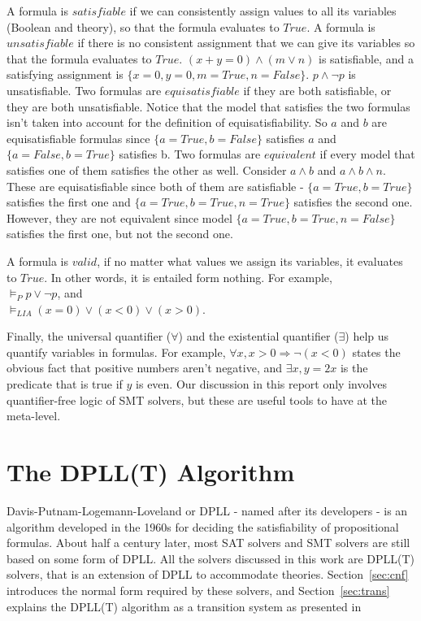 \documentclass{article}
\begin{document}
A formula is $satisfiable$ if we can consistently assign
values to all its variables (Boolean and theory), 
so that the formula evaluates to $True$. A formula is 
$unsatisfiable$ if there is no consistent assignment that 
we can give its variables so that the formula evaluates to 
$True$. $(x + y = 0) \land (m \lor n)$ is satisfiable, 
and a satisfying assignment is $\{x = 0, y = 0, m = True, 
n = False\}$. $p \land \neg p$ is unsatisfiable. Two formulas 
are $equisatisfiable$ if they are both satisfiable, or they 
are both unsatisfiable. Notice that the model that 
satisfies the two formulas isn't taken into account 
for the definition of equisatisfiability. So $a$ and $b$ are 
equisatisfiable formulas since $\{a = True, b = False\}$ 
satisfies $a$ and $\{a = False, b = True\}$ satisfies b. 
Two formulas are $equivalent$ if every model that satisfies 
one of them satisfies the other as well. Consider 
$a \land b$ and $a \land b \land n$. These are 
equisatisfiable since both of them are satisfiable - 
$\{a = True, b = True\}$ satisfies the first one and 
$\{a = True, b = True, n = True\}$ satisfies the second one.
However, they are not equivalent since model 
$\{a = True, b = True, n = False\}$ satisfies the first one, 
but not the second one.

A formula is $valid$, if no matter what values we assign its 
variables, it evaluates to $True$. In other words, it is
entailed form nothing. For example, \\
$\models_P p \lor \neg p$, and \\
$\models_{LIA} (x = 0) \lor (x < 0) \lor (x > 0)$.

Finally, the universal quantifier ($\forall$) and 
the existential quantifier ($\exists$) help us quantify 
variables in formulas. For example, $\forall x, x > 0 
\Rightarrow \neg (x < 0)$ states the obvious fact that 
positive numbers aren't negative, and $\exists x, y = 2x$ 
is the predicate that is true if $y$ is even. Our discussion 
in this report only involves quantifier-free logic of SMT 
solvers, but these are useful tools to have at the meta-level.


\section{The DPLL(T) Algorithm}
\label{sec:dpll}
Davis-Putnam-Logemann-Loveland or DPLL - named after its 
developers - is an algorithm developed in the 1960s 
for deciding the satisfiability of propositional formulas.
About half a century later, most SAT solvers and SMT solvers
are still based on some form of DPLL. All the solvers 
discussed in this work are DPLL(T) solvers, that is an 
extension of DPLL to accommodate theories. 
Section~\ref{sec:cnf}
introduces the normal form required by these solvers, 
and Section~\ref{sec:trans} explains the DPLL(T) algorithm as a 
transition system as presented 
in~\cite{DBLP:conf/fmcad/2016}
\end{document}
